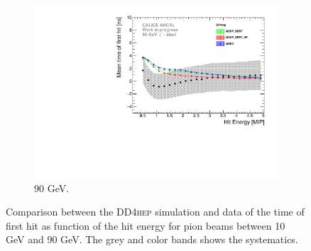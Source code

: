 \documentclass{JINST}
\newcommand\ddhep{\textsc{DD4hep}\xspace}
\begin{document}
\begin{figure}[htbp!]
\begin{subfigure}[t]{0.49\textwidth}
    \includegraphics[width=1\textwidth]{fig/Time_Energy_90GeV_DD4hep.pdf}
    \caption{90 GeV.} \label{fig:Energy_SimData_90GeV_DD4hep}
  \end{subfigure}
  \caption{Comparison between the \ddhep simulation and data of the time of first hit as function of the hit energy for pion beams between 10 GeV and 90 GeV. The grey and color bands shows the systematics.}
\end{figure}

\end{document}
